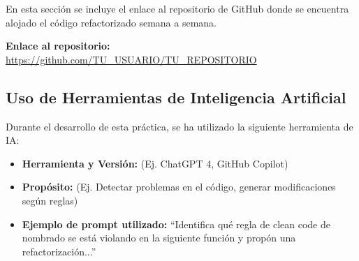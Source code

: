 En esta sección se incluye el enlace al repositorio de GitHub donde se encuentra alojado el código refactorizado semana a semana.

\textbf{Enlace al repositorio:} \url{https://github.com/TU_USUARIO/TU_REPOSITORIO}

\vspace{0.5cm}

\subsection*{Uso de Herramientas de Inteligencia Artificial}
Durante el desarrollo de esta práctica, se ha utilizado la siguiente herramienta de IA:
\begin{itemize}
    \item \textbf{Herramienta y Versión:} (Ej. ChatGPT 4, GitHub Copilot)
    \item \textbf{Propósito:} (Ej. Detectar problemas en el código, generar modificaciones según reglas)
    \item \textbf{Ejemplo de prompt utilizado:} ``Identifica qué regla de clean code de nombrado se está violando en la siguiente función y propón una refactorización...''
\end{itemize}

